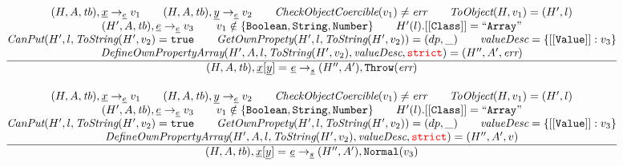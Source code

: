 \[\begin{array}{l@{~~}l@{~~}ll}
\frac{\begin{matrix}
\evale, \irid \rightarrow_{\ir\expr} v_1
\rulesep
\evale, \ir{y} \rightarrow_{\ir\expr} v_2
\rulesep
\hf{CheckObjectCoercible}(v_1) \not= \err
\rulesep
\hf{ToObject}(H, v_1) = (H',l)
\\
(H', A, \tb), \irexpr \rightarrow_{\ir\expr}  v_3
\rulesep
v_1 \notin \{{\tt Boolean, String, Number}\}
\rulesep
H'(l).[[{\tt Class}]] = {\tt``Array"}%
\\
\hf{CanPut}(H', l, \hf{ToString}(H', v_2) = \true
\rulesep
\hf{GetOwnPropety}(H', l, \hf{ToString}(H', v_2)) = (dp, \_)
\rulesep
\hf{valueDesc} = \{[[{\tt Value}]]:v_3\}
\\
\hf{DefineOwnPropertyArray}(H', A, l, \hf{ToString}(H', v_2), \hf{valueDesc}, \strict) = (H'', A', \err)
\end{matrix}}{\begin{matrix}
\state, \irid{\tt[}\ir{y}{\tt] =} \ \irexpr \rightarrow_{\ir\stmt}
(H'',A'), {\tt Throw}(\err)
\end{matrix}}
\\[2em]


\frac{\begin{matrix}
\evale, \irid \rightarrow_{\ir\expr} v_1
\rulesep
\evale, \ir{y} \rightarrow_{\ir\expr} v_2
\rulesep
\hf{CheckObjectCoercible}(v_1) \not= \err
\rulesep
\hf{ToObject}(H, v_1) = (H',l)
\\
(H', A, \tb), \irexpr \rightarrow_{\ir\expr} v_3
\rulesep
v_1 \notin \{{\tt Boolean, String, Number}\}
\rulesep
H'(l).[[{\tt Class}]] = {\tt``Array"}%
\\
\hf{CanPut}(H', l, \hf{ToString}(H', v_2) = \true
\rulesep
\hf{GetOwnPropety}(H', l, \hf{ToString}(H', v_2)) = (dp, \_)
\rulesep
\hf{valueDesc} = \{[[{\tt Value}]]:v_3\}
\\
\hf{DefineOwnPropertyArray}(H', A, l, \hf{ToString}(H', v_2), \hf{valueDesc}, \strict) = (H'', A', v)
\end{matrix}}{\begin{matrix}
\state, \irid{\tt[}\ir{y}{\tt] =} \ \irexpr \rightarrow_{\ir\stmt}
(H'',A'), {\tt Normal}(v_3)
\end{matrix}}
\\[2em]





\end{array}\]
